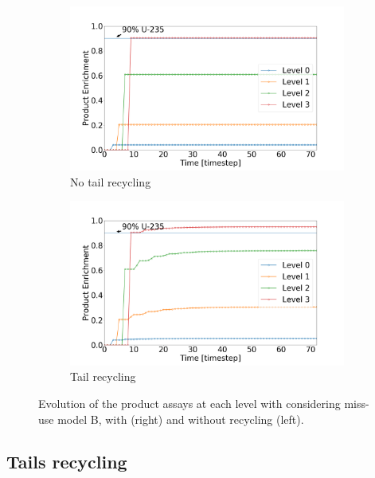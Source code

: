 \begin{figure}[h!]
    \centering
    \begin{subfigure}[t]{0.45\textwidth}
        \centering
        \includegraphics[scale=0.17]{NR_case2}
        \caption{No tail recycling}
        \label{sfig:case2_NR}
    \end{subfigure}%
    \begin{subfigure}[t]{0.45\textwidth}
        \centering
        \includegraphics[scale=0.17]{R_case2}
        \caption{Tail recycling}
        \label{sfig:case2_R}
    \end{subfigure}
    \caption{Evolution of the product assays at each level with considering
    miss-use model B, with (right) and without recycling (left).}
    \label{fig:case2}
\end{figure}

\subsection{Tails recycling}


